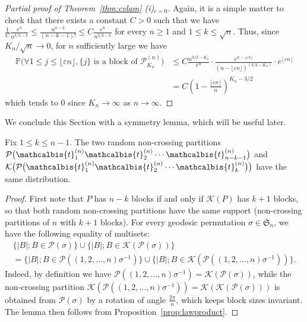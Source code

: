 \documentclass[10pt]{amsart}
\theoremstyle{definition}\newtheorem{defi}[theo]{Definition}\newtheorem{rema}[theo]{Remark}\newtheorem{exam}[theo]{Example}\newtheorem{exem}[theo]{Example}\newtheorem{nota}[theo]{Notation}
\renewcommand{\P}{\mathbb{P}}
\def\PPP{\mathcal P}
\def\tb{\mathcalbis{t}}
\renewcommand{\epsilon}{\varepsilon}
\begin{document}
\begin{proof}[Partial proof of Theorem~\ref{thm:cvlam} (i)$_{c=0}$]
Again, it is a simple matter to check that there exists a constant $C>0$ such that we have $ \tfrac{1}{C}  \tfrac{ e^{n}}{n^{3/2-k}} \leq  \tfrac{n^{n-2}}{(n-k-1)!} \leq C \tfrac{ e^{n}}{n^{3/2-k}}$ for every $n \geq 1$ and $1 \leq k \leq  \sqrt{n}$. Thus, since $K_{n}/\sqrt{n} \rightarrow 0$, for $n$ sufficiently large we have
\begin{align*}
\P \big( \forall 1 \leq j \leq \lfloor \epsilon n \rfloor, \{j\} \textrm{ is a block of } \PPP^{(n)}_{K_{n}}  \big) &\leq C \frac{n^{3/2-K_{n}}}{e^{n}} \cdot  \frac{e^{n-\lfloor \epsilon n \rfloor}}{(n-\lfloor \epsilon n \rfloor)^{(3/2-K_{n})}} \cdot e^{\lfloor \epsilon n \rfloor}\\
&= C \left( 1- \frac{\lfloor \epsilon n \rfloor}{n} \right)^{K_{n}-3/2}
\end{align*}
which tends to $0$ since $K_{n} \rightarrow \infty$ as $n \rightarrow \infty$.
\end{proof}




We conclude this Section with a symmetry lemma, which will be useful later.

\begin{lemma}
\label{lem:symmetry}
Fix $1 \leq k \leq n-1$. The two random non-crossing partitions
$\PPP\big(\tb_{1}^{(n)} \tb_{2}^{(n)} \cdots \tb_{n-k-1}^{(n)}\big)$
and $\mathcal{K}\big( \PPP\big(\tb_{1}^{(n)} \tb_{2}^{(n)} \cdots \tb_{k}^{(n)}\big)\big)$ have the same distribution.
\end{lemma}

\begin{proof}
  First note that $P$ has $n-k$ blocks if and only if $\mathcal{K}(P)$ has $k+1$ blocks,
  so that both random non-crossing partitions have the same support (non-crossing partitions of $n$
  with $k+1$ blocks).
For every geodesic permutation $\sigma \in \mathfrak{S}_{n}$, we have the following equality of multisets:
\begin{multline*}
\{|B| ; B \in \mathcal{P}(\sigma) \} \cup  \{|B| ; B \in \mathcal{K}( \mathcal{P}(\sigma)) \}\\
  =\{|B| ; B \in \mathcal{P}((1,2, \ldots,n) \sigma^{-1} ) \} \cup  \{|B| ; B \in \mathcal{K}( \mathcal{P}((1,2, \ldots,n) \sigma^{-1} )) \}.
\end{multline*}
Indeed, by definition we have $\mathcal{P}( (1,2, \ldots,n) \sigma^{-1} )=\mathcal{K}( \mathcal{P}(\sigma))$,
while the non-crossing partition $\mathcal{K}( \mathcal{P}( (1,2, \ldots,n) \sigma^{-1} ))=\mathcal K(\mathcal K( \mathcal{P}(\sigma)))$ is obtained from $ \mathcal{P}(\sigma)$
by a rotation of angle $\tfrac{2\pi}{n}$, which keeps block sizes invariant.
The lemma then follows from Proposition~\ref{prop:lawproduct}.
\end{proof}
\end{document}
